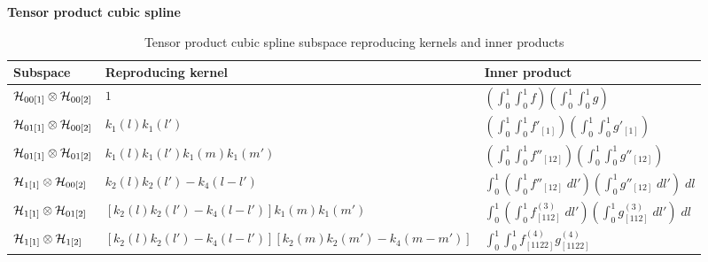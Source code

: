 \begin{example}{\textbf {Tensor product cubic spline}}
\begin{landscape}
\begin{table}[H]
\caption{Tensor product cubic spline subspace reproducing kernels and inner products} %
\centering %
\begin{tabular}{lll} %
\hline\hline %
Subspace 	& 		Reproducing kernel 		& 	Inner product \\
\hline %
$\mathcal{H}_{00\left[1\right]} \otimes \mathcal{H}_{00\left[2\right]}$ & 	$1$								     & 	$\left( \int_0^1 \int_0^1 f \right) \left( \int_0^1 \int_0^1 g \right)$ \\ [1ex] 
$\mathcal{H}_{01\left[1\right]} \otimes \mathcal{H}_{00\left[2\right]} $& 	$k_1\left(l\right)k_1\left(l'\right)$						     & 	$\left( \int_0^1 \int_0^1 f'_{\left[1\right]} \right) \left( \int_0^1 \int_0^1 g'_{\left[1\right]} \right)$ \\ [1ex] 
$\mathcal{H}_{01\left[1\right]} \otimes \mathcal{H}_{01\left[2\right]}$ & 	$k_1\left(l\right)k_1\left(l'\right)k_1\left(m\right)k_1\left(m'\right)$ & $\left( \int_0^1 \int_0^1 f''_{\left[12\right]} \right) \left( \int_0^1 \int_0^1 g''_{\left[12\right]} \right)$ \\ [1ex] 
$\mathcal{H}_{1\left[1\right]} \otimes \mathcal{H}_{00\left[2\right]}$  	& 	$k_2\left(l\right)k_2\left(l'\right) - k_4\left(l - l'\right)$	      & $\int_0^1 \left( \int_0^1 f''_{\left[12\right]}\;dl' \right) \left(  \int_0^1 g''_{\left[12\right]} \;dl'\right)\;dl $\\ [1ex] 
$\mathcal{H}_{1\left[1\right]} \otimes \mathcal{H}_{01\left[2\right]}$ 	& 	$\left[k_2\left(l\right)k_2\left(l'\right) - k_4\left(l - l'\right)\right]k_1\left(m\right)k_1\left(m'\right)$ & $\int_0^1 \left( \int_0^1 f^{\left(3\right)}_{\left[112\right]}\;dl' \right) \left(  \int_0^1 g^{\left(3\right)}_{\left[112\right]} \;dl'\right)\;dl$ \\ [1ex]  
$\mathcal{H}_{1\left[1\right]} \otimes \mathcal{H}_{1\left[2\right]}$  		& $\left[k_2\left(l\right)k_2\left(l'\right) - k_4\left(l - l'\right)\right]\left[k_2\left(m\right)k_2\left(m'\right) - k_4\left(m - m'\right)\right]$ & $\int_0^1  \int_0^1 f^{\left(4\right)}_{\left[1122\right]}g^{\left(4\right)}_{\left[1122\right]}$ \\ [1ex]  
\hline %
\end{tabular}
\label{table:tensor-product-cubic-spline-RK-table}
\end{table}
\end{landscape}
\end{example}





